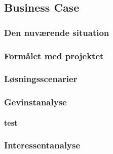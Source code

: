 \subsection{Business Case}
\subsubsection{Den nuværende situation}

\subsubsection{Formålet med projektet}

\subsubsection{Løsningsscenarier}

\subsubsection{Gevinstanalyse}
\paragraph{test}

\subsubsection{Interessentanalyse}
